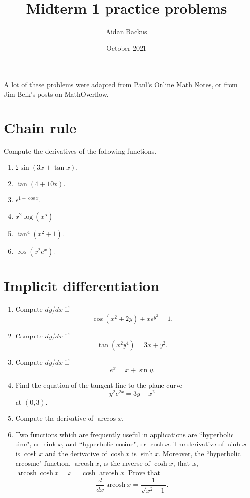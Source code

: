\documentclass[reqno,12pt,letterpaper]{amsart}
\title{Midterm 1 practice problems}
\author{Aidan Backus}
\date{October 2021}
\DeclareMathOperator{\arcosh}{arcosh}
\theoremstyle{definition}
\numberwithin{equation}{section}
\begin{document}




A lot of these problems were adapted from Paul's Online Math Notes, or from Jim Belk's posts on MathOverflow.

\section{Chain rule}
Compute the derivatives of the following functions.

\begin{enumerate}
\item $2\sin(3x+ \tan x)$.
\item $\tan(4+10x)$.
\item $e^{1- \cos x}$.
\item $x^2 \log(x^5)$.
\item $\tan^4(x^2 + 1)$.
\item $\cos(x^2e^x)$.
\end{enumerate}


\section{Implicit differentiation}
\begin{enumerate}
\item Compute $dy/dx$ if
$$\cos(x^2 + 2y) + xe^{y^2} = 1.$$
\item Compute $dy/dx$ if
$$\tan(x^2 y^4) = 3x + y^2.$$
\item Compute $dy/dx$ if
$$e^x = x + \sin y.$$
\item Find the equation of the tangent line to the plane curve
$$y^2 e^{2x} = 3y + x^2$$
at $(0, 3)$.
\item Compute the derivative of $\arccos x$.
\item Two functions which are frequently useful in applications are ``hyperbolic sine", or $\sinh x$, and ``hyperbolic cosine", or $\cosh x$. The derivative of $\sinh x$ is $\cosh x$ and the derivative of $\cosh x$ is $\sinh x$.
Moreover, the ``hyperbolic arcosine" function, $\arcosh x$, is the inverse of $\cosh x$, that is, $\arcosh \cosh x = x = \cosh \arcosh x$.
Prove that
$$\frac{d}{dx} \arcosh x = \frac{1}{\sqrt{x^2 - 1}}.$$
\end{enumerate}
\end{document}
